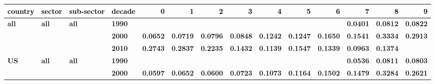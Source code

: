 \documentclass[
  authoryear,
  preprint,
  3p]{elsarticle}
\begin{document}
\begin{landscape}
\begin{longtable}[t]{>{}l>{}l>{}l>{}l>{}r>{}r>{}r>{}r>{}r>{}r>{}r>{}r>{}r>{}r}
\toprule
\textcolor{black}{\textbf{country}} & \textcolor{black}{\textbf{sector}} & \textcolor{black}{\textbf{sub-sector}} & \textcolor{black}{\textbf{decade}} & \textcolor{black}{\textbf{0}} & \textcolor{black}{\textbf{1}} & \textcolor{black}{\textbf{2}} & \textcolor{black}{\textbf{3}} & \textcolor{black}{\textbf{4}} & \textcolor{black}{\textbf{5}} & \textcolor{black}{\textbf{6}} & \textcolor{black}{\textbf{7}} & \textcolor{black}{\textbf{8}} & \textcolor{black}{\textbf{9}}\\
\midrule
\textbf{all} & \textbf{all} & \textbf{all} & \textbf{1990} & \textcolor[HTML]{4285f4}{\textbf{}} & \textcolor[HTML]{4285f4}{\textbf{}} & \textcolor[HTML]{4285f4}{\textbf{}} & \textcolor[HTML]{4285f4}{\textbf{}} & \textcolor[HTML]{4285f4}{\textbf{}} & \textcolor[HTML]{4285f4}{\textbf{}} & \textcolor[HTML]{4285f4}{\textbf{}} & \textcolor[HTML]{4285f4}{\textbf{0.0401}} & \textcolor[HTML]{4285f4}{\textbf{0.0812}} & \textcolor[HTML]{4285f4}{\textbf{0.0822}}\\
\textbf{} & \textbf{} & \textbf{} & \textbf{2000} & \textcolor[HTML]{4285f4}{\textbf{0.0652}} & \textcolor[HTML]{4285f4}{\textbf{0.0719}} & \textcolor[HTML]{4285f4}{\textbf{0.0796}} & \textcolor[HTML]{4285f4}{\textbf{0.0848}} & \textcolor[HTML]{4285f4}{\textbf{0.1242}} & \textcolor[HTML]{4285f4}{\textbf{0.1247}} & \textcolor[HTML]{4285f4}{\textbf{0.1650}} & \textcolor[HTML]{4285f4}{\textbf{0.1541}} & \textcolor[HTML]{4285f4}{\textbf{0.3334}} & \textcolor[HTML]{4285f4}{\textbf{0.2913}}\\
\textbf{} & \textbf{} & \textbf{} & \textbf{2010} & \textcolor[HTML]{4285f4}{\textbf{0.2743}} & \textcolor[HTML]{4285f4}{\textbf{0.2837}} & \textcolor[HTML]{4285f4}{\textbf{0.2235}} & \textcolor[HTML]{4285f4}{\textbf{0.1432}} & \textcolor[HTML]{4285f4}{\textbf{0.1139}} & \textcolor[HTML]{4285f4}{\textbf{0.1547}} & \textcolor[HTML]{4285f4}{\textbf{0.1339}} & \textcolor[HTML]{4285f4}{\textbf{0.0963}} & \textcolor[HTML]{4285f4}{\textbf{0.1374}} & \textcolor[HTML]{4285f4}{\textbf{}}\\
\textbf{US} & \textbf{all} & \textbf{all} & \textbf{1990} & \textcolor[HTML]{4285f4}{\textbf{}} & \textcolor[HTML]{4285f4}{\textbf{}} & \textcolor[HTML]{4285f4}{\textbf{}} & \textcolor[HTML]{4285f4}{\textbf{}} & \textcolor[HTML]{4285f4}{\textbf{}} & \textcolor[HTML]{4285f4}{\textbf{}} & \textcolor[HTML]{4285f4}{\textbf{}} & \textcolor[HTML]{4285f4}{\textbf{0.0536}} & \textcolor[HTML]{4285f4}{\textbf{0.0811}} & \textcolor[HTML]{4285f4}{\textbf{0.0803}}\\
\textbf{} & \textbf{} & \textbf{} & \textbf{2000} & \textcolor[HTML]{4285f4}{\textbf{0.0597}} & \textcolor[HTML]{4285f4}{\textbf{0.0652}} & \textcolor[HTML]{4285f4}{\textbf{0.0600}} & \textcolor[HTML]{4285f4}{\textbf{0.0723}} & \textcolor[HTML]{4285f4}{\textbf{0.1073}} & \textcolor[HTML]{4285f4}{\textbf{0.1164}} & \textcolor[HTML]{4285f4}{\textbf{0.1502}} & \textcolor[HTML]{4285f4}{\textbf{0.1479}} & \textcolor[HTML]{4285f4}{\textbf{0.3284}} & \textcolor[HTML]{4285f4}{\textbf{0.2621}}\\

\end{longtable}
\end{landscape}
\end{document}
